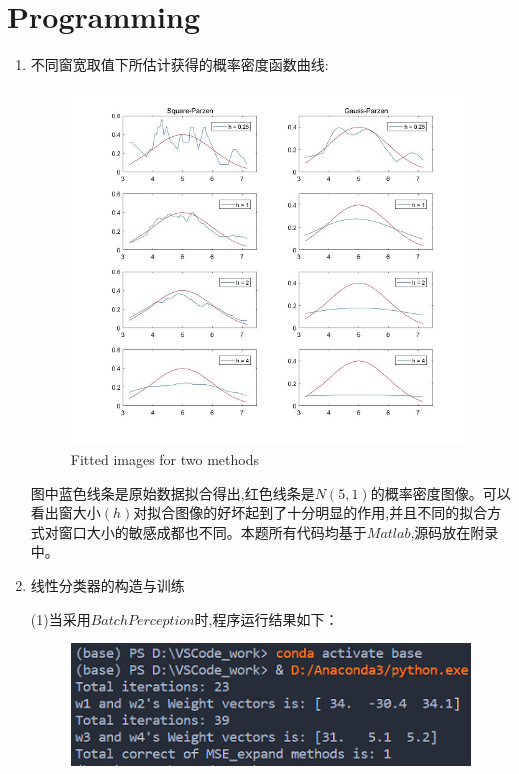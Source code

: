 \documentclass[homework]{IEEEtran}
\begin{document}
\section{Programming}
\begin{CJK}{UTF8}{gkai}
    \begin{enumerate}[]
		\item 不同窗宽取值下所估计获得的概率密度函数曲线:\par
        \begin{figure}[htb]
            \centerline{\includegraphics{Images/fig4.jpg}}
            \caption{Fitted images for two methods}
            \label{fig} \par
        \end{figure}
        图中蓝色线条是原始数据拟合得出,红色线条是$N(5,1)$的概率密度图像。可以看出窗大小$(h)$对拟合图像的好坏起到了十分明显的作用,并且不同的拟合方式对窗口大小的敏感成都也不同。本题所有代码均基于$Matlab$,源码放在附录中。
        \item 线性分类器的构造与训练 \par
        (1)当采用$Batch Perception$时,程序运行结果如下：\par
        \begin{figure}[htb]
            \centerline{\includegraphics{Images/fig5.png}}

\end{figure}
\end{enumerate}
\end{CJK}
\end{document}
